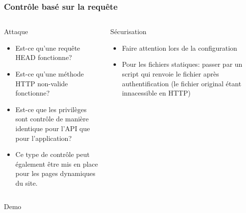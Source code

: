 \documentclass[aspectratio=169]{beamer}  %
\newcommand{\demo}{
\begin{frame}[noframenumbering]
  \begin{center}
    \Huge Demo
  \end{center}
\end{frame}}
\begin{document}
\begin{frame}
  \frametitle{Contrôle basé sur la requête}
  \begin{columns}[T]
      \begin{alertblock}{Attaque}
        \begin{itemize}
          \item Est-ce qu'une requête HEAD fonctionne?
          \item Est-ce qu'une méthode HTTP non-valide fonctionne?
          \item Est-ce que les privilèges sont contrôle de manière identique pour l'API que pour l'application?
          \item Ce type de contrôle peut également être mis en place pour les pages dynamiques du site.
        \end{itemize}
      \end{alertblock}
      \begin{exampleblock}{Sécurisation}
        \begin{itemize}
          \item Faire attention lors de la configuration
          \item Pour les fichiers statiques: passer par un script qui renvoie le fichier après authentification (le fichier original étant innacessible en HTTP)
        \end{itemize}
      \end{exampleblock}
  \end{columns}
\end{frame}

\demo
\end{document}
